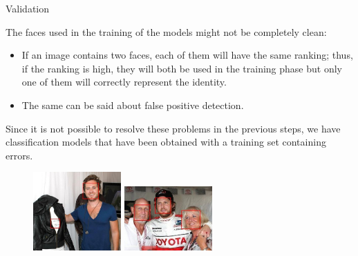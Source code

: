 \begin{tframe}{Validation}

The faces used in the training of the models might not be completely clean:

\begin{itemize}
\item If an image contains two faces, each of them will have the same ranking; thus, if the ranking is high, they will both be used in the training phase but only one of them will correctly represent the identity.
\item The same can be said about false positive detection.
\end{itemize}

\vspace{0.1in}

Since it is not possible to resolve these problems in the previous steps, we have classification models that have been obtained with a training set containing errors.

\begin{figure}[h]
\centering
\hspace*{\fill}
\includegraphics[width=0.30\textwidth]{images/image1a.jpg}
\hspace*{\fill}
\includegraphics[width=0.30\textwidth]{images/image2a.jpg}
\hspace*{\fill}
\end{figure}

\end{tframe}


